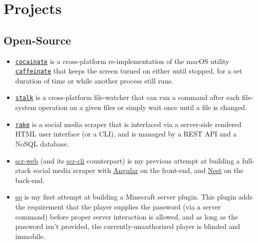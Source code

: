 \documentclass[a4paper, 10pt]{article}
\begin{document}
	\section{Projects}
	\subsection{Open-Source}
	\begin{itemize}
		\item \href{https://github.com/AppleGamer22/cocainate}{\texttt{cocainate}} is a cross-platform re-implementation of the macOS utility \href{https://github.com/apple-oss-distributions/PowerManagement/tree/main/caffeinate}{\texttt{caffeinate}} that keeps the screen turned on either until stopped, for a set duration of time or while another process still runs.
		\item \href{https://github.com/AppleGamer22/stalk}{\texttt{stalk}} is a cross-platform file-watcher that can run a command after each file-system operation on a given files or simply wait once until a file is changed.
		\item \href{https://github.com/AppleGamer22/rake}{\texttt{rake}} is a social media scraper that is interfaced via a server-side rendered HTML user interface (or a CLI), and is managed by a REST API and a NoSQL database.
		\item \href{https://github.com/AppleGamer22/scr-web}{scr-web} (and its \href{https://github.com/AppleGamer22/scr-cli}{scr-cli} counterpart) is my previous attempt at building a full-stack social media scraper with \href{https://angular.io}{Angular} on the front-end, and \href{https://nestjs.com}{Nest} on the back-end.
		\item \href{https://github.com/AppleGamer22/sp}{sp} is my first attempt at building a Minecraft server plugin. This plugin adds the requirement that the player supplies the password (via a server command) before proper server interaction is allowed, and as long as the password isn't provided, the currently-unauthorized player is blinded and immobile.
	\end{itemize}
\end{document}
